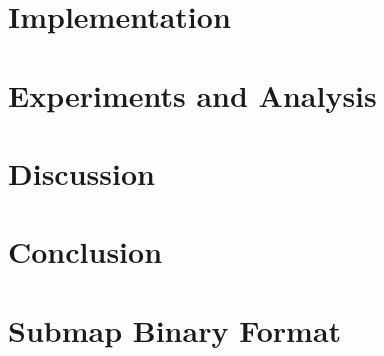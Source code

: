 \documentclass[10pt,letterpaper]{article}
\begin{document}
\section{Implementation}


\section{Experiments and Analysis}


\section{Discussion}


\section{Conclusion}





\appendix
\section{Submap Binary Format}

\end{document}

